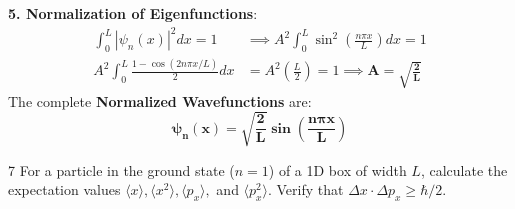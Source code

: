\begin{theorysol}
\textbf{5. Normalization of Eigenfunctions}:
\begin{align*}
\int_0^L |\psi_n(x)|^2 dx = 1 &\implies A^2 \int_0^L \sin^2\left(\frac{n\pi x}{L}\right)dx = 1 \\
A^2 \int_0^L \frac{1 - \cos(2n\pi x/L)}{2}dx &= A^2 \left(\frac{L}{2}\right) = 1 \implies \mathbf{A = \sqrt{\frac{2}{L}}}
\end{align*}
The complete \textbf{Normalized Wavefunctions} are:
\begin{equation}
\mathbf{\psi_n(x) = \sqrt{\frac{2}{L}}\sin\left(\frac{n\pi x}{L}\right)}
\end{equation}
\end{theorysol}
\vspace{4mm}

\begin{theoryq}{7}
For a particle in the ground state ($n=1$) of a 1D box of width $L$, calculate the expectation values $\langle x \rangle, \langle x^2 \rangle, \langle p_x \rangle,$ and $\langle p_x^2 \rangle$. Verify that $\Delta x \cdot \Delta p_x \ge \hbar/2$.
\end{theoryq}
